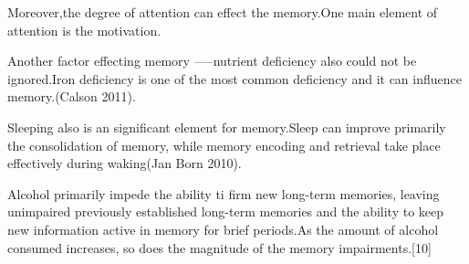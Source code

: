 \documentclass{article}
\begin{document}
Moreover,the degree of attention can effect the memory.One main element of attention is the motivation. 

Another factor effecting memory -----nutrient deficiency also could not be ignored.Iron deficiency is one of the most common deficiency and it can influence memory.(Calson 2011).

Sleeping also is an significant element for memory.Sleep can improve primarily the consolidation of memory, while memory encoding and retrieval take place effectively during waking(Jan Born 2010).

Alcohol primarily impede the ability ti firm new long-term memories, leaving unimpaired previously established long-term memories and the ability to keep new information active in memory for brief periods.As the amount of alcohol consumed increases, so does the magnitude of the memory impairments.[10]


\printbibliography[title={Reference},heading=bibnumbered]{}
\end{document}
